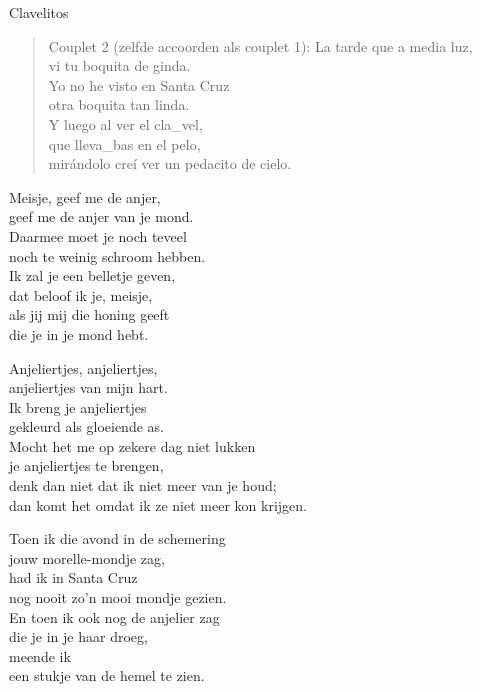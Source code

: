 \begin{song}[vals]{Clavelitos}
\begin{verse}{Couplet 2 (zelfde accoorden als couplet 1):}
La tarde que a media luz,\\
vi tu boquita de ginda.\\
Yo no he visto en Santa Cruz\\
otra boquita tan linda. \hspace{1em} \hspace{1em} \hspace{1em}\\
Y luego al ver el cla\_vel,\\
\hspace{1em} que lleva\_bas  \hspace{1em} en el pelo, \hspace{1em} \hspace{1em} \hspace{1em}\\
mirándolo creí  \hspace{1em}ver
un pedacito de cielo.
\end{verse}
\end{song}

\clearpage
\begin{translation}
Meisje, geef me de anjer,\\
geef me de anjer van je mond.\\
Daarmee moet je noch teveel\\
noch te weinig schroom hebben.\\
Ik zal je een belletje geven,\\
dat beloof ik je, meisje,\\
als jij mij die honing geeft\\
die je in je mond hebt.\vspace{\wlskip}

Anjeliertjes, anjeliertjes,\\
anjeliertjes van mijn hart.\\
Ik breng je anjeliertjes\\
gekleurd als gloeiende as.\\
Mocht het me op zekere dag niet lukken\\
je anjeliertjes te brengen,\\
denk dan niet dat ik niet meer van je houd;\\
dan komt het omdat ik ze niet meer kon krijgen.\vspace{\wlskip}

Toen ik die avond in de schemering\\
jouw morelle-mondje zag,\\
had ik in Santa Cruz\\
nog nooit zo'n mooi mondje gezien.\\
En toen ik ook nog de anjelier zag\\
die je in je haar droeg,\\
meende ik\\
een stukje van de hemel te zien.
\end{translation}
